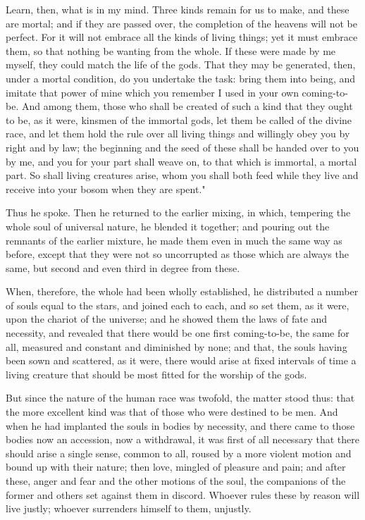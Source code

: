  Learn, then, what is in my mind. Three kinds remain for us to make, and these are mortal; and if they are passed over, the completion of the heavens will not be perfect. For it will not embrace all the kinds of living things; yet it must embrace them, so that nothing be wanting from the whole. If these were made by me myself, they could match the life of the gods. That they may be generated, then, under a mortal condition, do you undertake the task: bring them into being, and imitate that power of mine which you remember I used in your own coming-to-be. And among them, those who shall be created of such a kind that they ought to be, as it were, kinsmen of the immortal gods, let them be called of the divine race, and let them hold the rule over all living things and willingly obey you by right and by law; the beginning and the seed of these shall be handed over to you by me, and you for your part shall weave on, to that which is immortal, a mortal part. So shall living creatures arise, whom you shall both feed while they live and receive into your bosom when they are spent."

 Thus he spoke. Then he returned to the earlier mixing, in which, tempering the whole soul of universal nature, he blended it together; and pouring out the remnants of the earlier mixture, he made them even in much the same way as before, except that they were not so uncorrupted as those which are always the same, but second and even third in degree from these.

 When, therefore, the whole had been wholly established, he distributed a number of souls equal to the stars, and joined each to each, and so set them, as it were, upon the chariot of the universe; and he showed them the laws of fate and necessity, and revealed that there would be one first coming-to-be, the same for all, measured and constant and diminished by none; and that, the souls having been sown and scattered, as it were, there would arise at fixed intervals of time a living creature that should be most fitted for the worship of the gods.

 But since the nature of the human race was twofold, the matter stood thus: that the more excellent kind was that of those who were destined to be men. And when he had implanted the souls in bodies by necessity, and there came to those bodies now an accession, now a withdrawal, it was first of all necessary that there should arise a single sense, common to all, roused by a more violent motion and bound up with their nature; then love, mingled of pleasure and pain; and after these, anger and fear and the other motions of the soul, the companions of the former and others set against them in discord. Whoever rules these by reason will live justly; whoever surrenders himself to them, unjustly.

